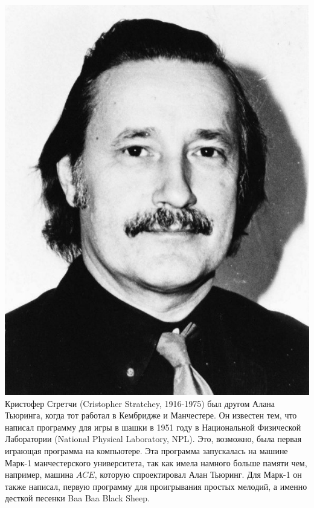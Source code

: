 \documentclass[14pt]{matmex-diploma-custom}
\begin{document}
\includegraphics[angle=0,scale=0.2]{stratchey.jpg}
Кристофер Стретчи (Cristopher Stratchey, 1916-1975) был другом Алана Тьюринга, когда тот работал в Кембридже и Манчестере. Он известен тем, что написал программу для игры в шашки в 1951 году в Национальной Физической Лаборатории (National Physical Laboratory, NPL). Это, возможно, была первая играющая программа на компьютере. Эта программа запускалась на машине Марк-1 манчестерского университета, так как имела намного больше памяти чем, например, машина $ACE$, которую спроектировал Алан Тьюринг. Для Марк-1 он также написал, первую программу для проигрывания простых мелодий, а именно десткой песенки Baa Baa Black Sheep.
\end{document}
